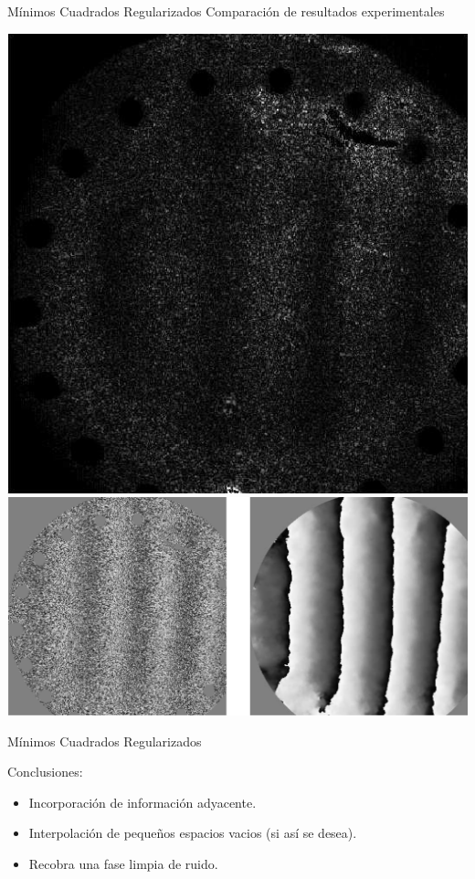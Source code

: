 \documentclass[]{beamer}
\begin{document}
\begin{frame}{M\'inimos Cuadrados Regularizados}
Comparaci\'on de resultados experimentales

\begin{center}
\includegraphics[scale=0.27]{Images/InterferogramLS-exp.png}\\
\includegraphics[scale=0.29]{Images/LS-Regularized-exp.png}

\end{center}
\end{frame}
\begin{frame}{M\'inimos Cuadrados Regularizados}

Conclusiones:
\begin{itemize}
     \item Incorporaci\'on de informaci\'on adyacente.
     \pause \item Interpolaci\'on de peque\~nos espacios vacios (si as\'i se desea).
     \pause \item Recobra una fase limpia de ruido.
\end{itemize}

\end{frame}
\end{document}
